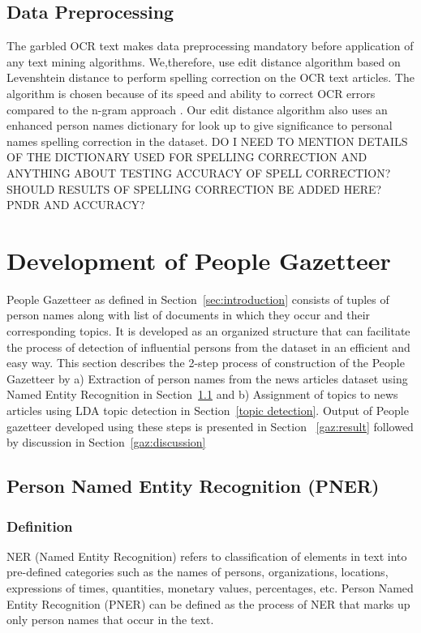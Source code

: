 \documentclass[10pt,journal,compsoc]{IEEEtran}
\begin{document}
\subsection{Data Preprocessing}
The garbled OCR text makes data preprocessing mandatory before application of any text mining algorithms. We,therefore, use edit distance algorithm based on Levenshtein distance to perform spelling correction on the OCR text articles. The algorithm is chosen because of its speed and ability to correct OCR errors compared to the n-gram approach \cite{chattopadhyaya2013fast}. Our edit distance algorithm also uses an enhanced person names dictionary for look up to give significance to personal names spelling correction in the dataset. 
DO I NEED TO MENTION DETAILS OF THE DICTIONARY USED FOR SPELLING CORRECTION AND ANYTHING ABOUT TESTING ACCURACY OF SPELL CORRECTION?
SHOULD RESULTS OF SPELLING CORRECTION BE ADDED HERE? PNDR AND ACCURACY?




\section{Development of People Gazetteer}
\label{chapter:people gazetteer}

People Gazetteer as defined in Section~\ref{sec:introduction} consists of tuples of person names along with list of documents in which they occur and their corresponding topics. It is developed as an organized structure that can facilitate the process of detection of influential persons from the dataset in an efficient and easy way. This section describes the 2-step process of construction of the People Gazetteer by
a) Extraction of person names from the news articles dataset using Named Entity Recognition in  Section~\ref{ner} and
b) Assignment of topics to news articles using LDA topic detection in  Section~\ref{topic detection}.
Output of People gazetteer developed using these steps is presented in Section ~\ref{gaz:result} followed by discussion in Section~\ref{gaz:discussion}

\subsection{Person Named Entity Recognition (PNER)}
\label{ner}


\subsubsection{Definition}
NER (Named Entity Recognition) refers to classification of elements in text into pre-defined categories such as the names of persons, organizations, locations, expressions of times, quantities, monetary values, percentages, etc. 
Person Named Entity Recognition (PNER) can be defined as the process of NER that marks up only person names that occur in the text.
\end{document}
